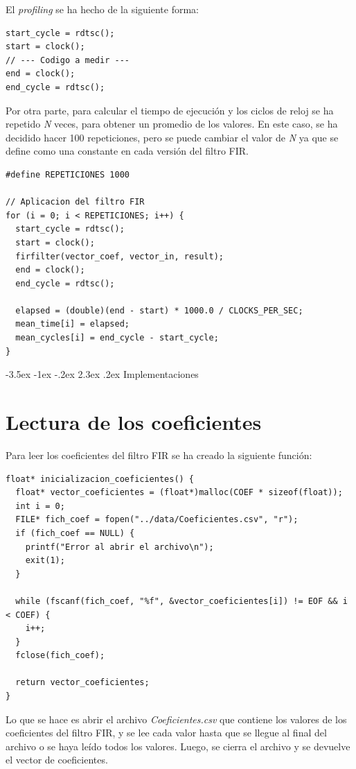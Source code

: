 \documentclass[11pt]{report}
\makeatletter
\renewcommand\chapter{\@startsection{chapter}{0}{\z@}%
    {-3.5ex \@plus -1ex \@minus -.2ex}%
    {2.3ex \@plus.2ex}%
    {\normalfont\Large\bfseries}}
\makeatother
\begin{document}
El \emph{profiling} se ha hecho de la siguiente forma:
\begin{lstlisting}
start_cycle = rdtsc();
start = clock();
// --- Codigo a medir ---
end = clock();
end_cycle = rdtsc();
\end{lstlisting}

Por otra parte, para calcular el tiempo de ejecución y los ciclos de reloj se ha repetido \emph{N} veces, para obtener un promedio de los valores.
En este caso, se ha decidido hacer 100 repeticiones, pero se puede cambiar el valor de \emph{N}
ya que se define como una constante en cada versión del filtro FIR.
\begin{lstlisting}
#define REPETICIONES 1000

// Aplicacion del filtro FIR
for (i = 0; i < REPETICIONES; i++) {
  start_cycle = rdtsc();
  start = clock();
  firfilter(vector_coef, vector_in, result);
  end = clock();
  end_cycle = rdtsc();

  elapsed = (double)(end - start) * 1000.0 / CLOCKS_PER_SEC;
  mean_time[i] = elapsed;
  mean_cycles[i] = end_cycle - start_cycle;
}
\end{lstlisting}

\newpage

\chapter{Implementaciones}
\section*{Lectura de los coeficientes}
Para leer los coeficientes del filtro FIR se ha creado la siguiente función:
\begin{lstlisting}
float* inicializacion_coeficientes() {
  float* vector_coeficientes = (float*)malloc(COEF * sizeof(float));
  int i = 0;
  FILE* fich_coef = fopen("../data/Coeficientes.csv", "r");
  if (fich_coef == NULL) {
    printf("Error al abrir el archivo\n");
    exit(1);
  }

  while (fscanf(fich_coef, "%f", &vector_coeficientes[i]) != EOF && i < COEF) {
    i++;
  }
  fclose(fich_coef);

  return vector_coeficientes;
}
\end{lstlisting}

Lo que se hace es abrir el archivo \emph{Coeficientes.csv} que contiene los valores de los coeficientes del filtro FIR, y se lee cada valor
hasta que se llegue al final del archivo o se haya leído todos los valores. Luego, se cierra el archivo y se devuelve el vector de coeficientes.
\end{document}
